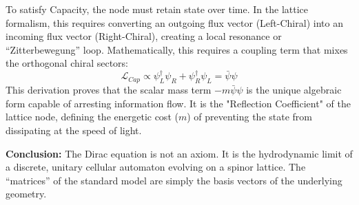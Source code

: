 To satisfy Capacity, the node must retain state over time. In the lattice formalism, this requires converting an outgoing flux vector (Left-Chiral) into an incoming flux vector (Right-Chiral), creating a local resonance or ``Zitterbewegung'' loop.
Mathematically, this requires a coupling term that mixes the orthogonal chiral sectors:
\begin{equation}
    \mathcal{L}_{Cap} \propto \psi_L^\dagger \psi_R + \psi_R^\dagger \psi_L = \bar{\psi} \psi
\end{equation}
This derivation proves that the scalar mass term $-m\bar{\psi}\psi$ is the unique algebraic form capable of arresting information flow. It is the "Reflection Coefficient" of the lattice node, defining the energetic cost ($m$) of preventing the state from dissipating at the speed of light.

\textbf{Conclusion:} The Dirac equation is not an axiom. It is the hydrodynamic limit of a discrete, unitary cellular automaton evolving on a spinor lattice. The ``matrices'' of the standard model are simply the basis vectors of the underlying geometry.